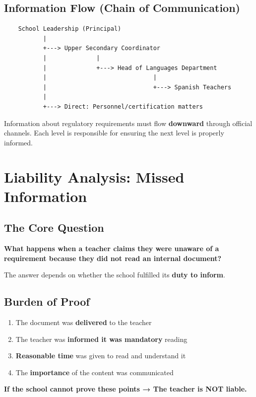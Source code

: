 \documentclass[11pt,a4paper]{article}
\begin{document}
\subsection{Information Flow (Chain of Communication)}

\begin{verbatim}
    School Leadership (Principal)
           |
           +---> Upper Secondary Coordinator
           |              |
           |              +---> Head of Languages Department
           |                              |
           |                              +---> Spanish Teachers
           |
           +---> Direct: Personnel/certification matters
\end{verbatim}

\begin{infobox}
Information about regulatory requirements must flow \textbf{downward} through official channels. Each level is responsible for ensuring the next level is properly informed.
\end{infobox}

\section{Liability Analysis: Missed Information}

\subsection{The Core Question}

\textbf{What happens when a teacher claims they were unaware of a requirement because they did not read an internal document?}

The answer depends on whether the school fulfilled its \textbf{duty to inform}.

\subsection{Burden of Proof}

\begin{warningbox}
\begin{enumerate}[nosep]
    \item The document was \textbf{delivered} to the teacher
    \item The teacher was \textbf{informed it was mandatory} reading
    \item \textbf{Reasonable time} was given to read and understand it
    \item The \textbf{importance} of the content was communicated
\end{enumerate}
\textbf{If the school cannot prove these points → The teacher is NOT liable.}
\end{warningbox}
\end{document}
